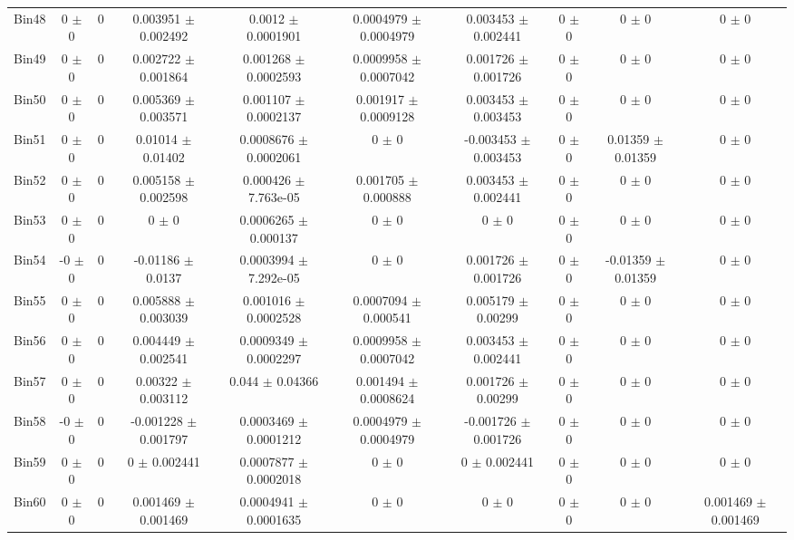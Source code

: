 \begin{tabular}{@{\extracolsep{4pt}}lccccccccc@{}}
     Bin48 & 0 $\pm$ 0 & 0 & 0.003951 $\pm$ 0.002492 & 0.0012 $\pm$ 0.0001901 & 0.0004979 $\pm$ 0.0004979 & 0.003453 $\pm$ 0.002441 & 0 $\pm$ 0 & 0 $\pm$ 0 & 0 $\pm$ 0 \\ 
     Bin49 & 0 $\pm$ 0 & 0 & 0.002722 $\pm$ 0.001864 & 0.001268 $\pm$ 0.0002593 & 0.0009958 $\pm$ 0.0007042 & 0.001726 $\pm$ 0.001726 & 0 $\pm$ 0 & 0 $\pm$ 0 & 0 $\pm$ 0 \\ 
     Bin50 & 0 $\pm$ 0 & 0 & 0.005369 $\pm$ 0.003571 & 0.001107 $\pm$ 0.0002137 & 0.001917 $\pm$ 0.0009128 & 0.003453 $\pm$ 0.003453 & 0 $\pm$ 0 & 0 $\pm$ 0 & 0 $\pm$ 0 \\ 
     Bin51 & 0 $\pm$ 0 & 0 & 0.01014 $\pm$ 0.01402 & 0.0008676 $\pm$ 0.0002061 & 0 $\pm$ 0 & -0.003453 $\pm$ 0.003453 & 0 $\pm$ 0 & 0.01359 $\pm$ 0.01359 & 0 $\pm$ 0 \\ 
     Bin52 & 0 $\pm$ 0 & 0 & 0.005158 $\pm$ 0.002598 & 0.000426 $\pm$ 7.763e-05 & 0.001705 $\pm$ 0.000888 & 0.003453 $\pm$ 0.002441 & 0 $\pm$ 0 & 0 $\pm$ 0 & 0 $\pm$ 0 \\ 
     Bin53 & 0 $\pm$ 0 & 0 & 0 $\pm$ 0 & 0.0006265 $\pm$ 0.000137 & 0 $\pm$ 0 & 0 $\pm$ 0 & 0 $\pm$ 0 & 0 $\pm$ 0 & 0 $\pm$ 0 \\ 
     Bin54 & -0 $\pm$ 0 & 0 & -0.01186 $\pm$ 0.0137 & 0.0003994 $\pm$ 7.292e-05 & 0 $\pm$ 0 & 0.001726 $\pm$ 0.001726 & 0 $\pm$ 0 & -0.01359 $\pm$ 0.01359 & 0 $\pm$ 0 \\ 
     Bin55 & 0 $\pm$ 0 & 0 & 0.005888 $\pm$ 0.003039 & 0.001016 $\pm$ 0.0002528 & 0.0007094 $\pm$ 0.000541 & 0.005179 $\pm$ 0.00299 & 0 $\pm$ 0 & 0 $\pm$ 0 & 0 $\pm$ 0 \\ 
     Bin56 & 0 $\pm$ 0 & 0 & 0.004449 $\pm$ 0.002541 & 0.0009349 $\pm$ 0.0002297 & 0.0009958 $\pm$ 0.0007042 & 0.003453 $\pm$ 0.002441 & 0 $\pm$ 0 & 0 $\pm$ 0 & 0 $\pm$ 0 \\ 
     Bin57 & 0 $\pm$ 0 & 0 & 0.00322 $\pm$ 0.003112 & 0.044 $\pm$ 0.04366 & 0.001494 $\pm$ 0.0008624 & 0.001726 $\pm$ 0.00299 & 0 $\pm$ 0 & 0 $\pm$ 0 & 0 $\pm$ 0 \\ 
     Bin58 & -0 $\pm$ 0 & 0 & -0.001228 $\pm$ 0.001797 & 0.0003469 $\pm$ 0.0001212 & 0.0004979 $\pm$ 0.0004979 & -0.001726 $\pm$ 0.001726 & 0 $\pm$ 0 & 0 $\pm$ 0 & 0 $\pm$ 0 \\ 
     Bin59 & 0 $\pm$ 0 & 0 & 0 $\pm$ 0.002441 & 0.0007877 $\pm$ 0.0002018 & 0 $\pm$ 0 & 0 $\pm$ 0.002441 & 0 $\pm$ 0 & 0 $\pm$ 0 & 0 $\pm$ 0 \\ 
     Bin60 & 0 $\pm$ 0 & 0 & 0.001469 $\pm$ 0.001469 & 0.0004941 $\pm$ 0.0001635 & 0 $\pm$ 0 & 0 $\pm$ 0 & 0 $\pm$ 0 & 0 $\pm$ 0 & 0.001469 $\pm$ 0.001469 \\ 
\hline\hline
  \end{tabular}
